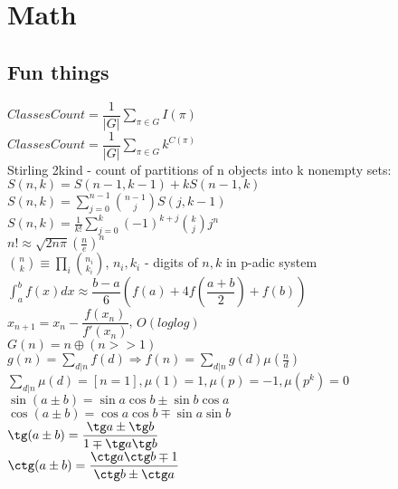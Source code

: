 \chapter{Math}

{}
{}
{}
\columnbreak
\section{Fun things}
$ClassesCount = \dfrac{1}{|G|} \sum_{\pi \in G} I(\pi)$\\
$ClassesCount = \dfrac{1}{|G|} \sum_{\pi \in G} k^{C(\pi)}$\\
Stirling 2kind - count of partitions of n objects into k nonempty sets:\\
$S(n,k) = S(n-1,k-1) + kS(n-1,k)$\\
$S(n,k) = \sum_{j=0}^{n-1} \binom{n-1}{j}S(j,k-1)$\\
$S(n,k) = \frac{1}{k!}\sum_{j=0}^k(-1)^{k+j}\binom{k}{j}j^n$\\
$n! \approx \sqrt{2n\pi}(\frac{n}{e})^n$\\
$\binom{n}{k} \equiv \prod_{i}\binom{n_i}{k_i}$, $n_i, k_i$ - digits of $n,k$ in p-adic system
$\int_{a}^{b}f(x)dx \approx \dfrac{b-a}{6}(f(a) + 4f(\dfrac{a+b}
{2})+f(b))$\\
$x_{n+1} = x_n - \dfrac{f(x_n)}{f'(x_n)}$, $O(loglog)$\\
$G(n) = n \oplus (n >> 1)$\\
$g(n) = \sum_{d|n} f(d) \Rightarrow f(n) = \sum_{d|n} g(d) \mu(\frac{n}{d})$\\
$\sum_{d|n} \mu(d) = [n = 1],   \mu(1) = 1, \mu(p) = -1, \mu(p^k) = 0$\\
$\sin(a \pm b) = \sin a \cos b \pm \sin b \cos a$\\
$\cos(a \pm b) = \cos a \cos b \mp \sin a \sin b$\\
$\tg(a\pm b) = \dfrac{\tg a \pm \tg b}{1 \mp \tg a \tg b}$\\
$\ctg(a \pm b) = \dfrac{\ctg a \ctg b \mp 1}{\ctg b \pm \ctg a}$\\
